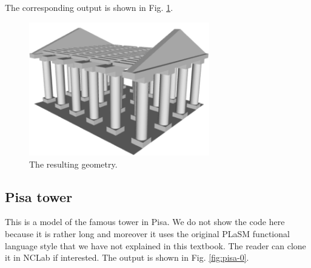 The corresponding output is shown in Fig. \ref{fig:temple}.

\begin{figure}[!ht]
\begin{center}
\includegraphics[width=0.7\textwidth]{img/temple.png}
\end{center}
\vspace{-4mm}
\caption{The resulting geometry.}
\label{fig:temple}
\end{figure}
\noindent

\subsection{Pisa tower}

This is a model of the famous tower in Pisa. We do not show the code here 
because it is rather long and moreover it uses the original PLaSM functional
language style that we have not explained in this textbook. 
The reader can clone it in NCLab if interested. The output 
is shown in Fig. \ref{fig:pisa-0}.

